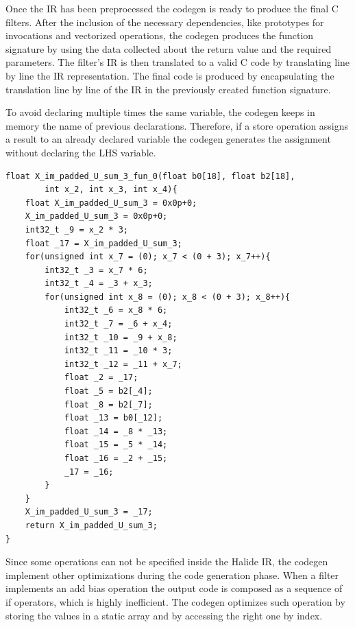 \documentclass[../main.tex]{subfiles}
\begin{document}
Once the IR has been preprocessed the codegen is ready to produce the final C filters.
After the inclusion of the necessary dependencies, like prototypes for invocations and vectorized operations, the codegen produces the function signature by using the data collected about the return value and the required parameters.
The filter's IR is then translated to a valid C code by translating line by line the IR representation.
The final code is produced by encapsulating the translation line by line of the IR in the previously created function signature.

To avoid declaring multiple times the same variable, the codegen keeps in memory the name of previous declarations.
Therefore, if a store operation assigns a result to an already declared variable the codegen generates the assignment without declaring the LHS variable.

\begin{lstlisting}[caption = Output C code of the example filter. The Halide IR has been translated to C code and encapsulated. Since the filter compute only one value a return statement has been added at the end of the function.]
float X_im_padded_U_sum_3_fun_0(float b0[18], float b2[18],
        int x_2, int x_3, int x_4){
    float X_im_padded_U_sum_3 = 0x0p+0;
    X_im_padded_U_sum_3 = 0x0p+0;
    int32_t _9 = x_2 * 3;
    float _17 = X_im_padded_U_sum_3;
    for(unsigned int x_7 = (0); x_7 < (0 + 3); x_7++){
        int32_t _3 = x_7 * 6;
        int32_t _4 = _3 + x_3;
        for(unsigned int x_8 = (0); x_8 < (0 + 3); x_8++){
            int32_t _6 = x_8 * 6;
            int32_t _7 = _6 + x_4;
            int32_t _10 = _9 + x_8;
            int32_t _11 = _10 * 3;
            int32_t _12 = _11 + x_7;
            float _2 = _17;
            float _5 = b2[_4];
            float _8 = b2[_7];
            float _13 = b0[_12];
            float _14 = _8 * _13;
            float _15 = _5 * _14;
            float _16 = _2 + _15;
            _17 = _16;
        }
    }
    X_im_padded_U_sum_3 = _17;
    return X_im_padded_U_sum_3;
}
\end{lstlisting}

Since some operations can not be specified inside the Halide IR, the codegen implement other optimizations during the code generation phase.
When a filter implements an add bias operation the output code is composed as a sequence of if operators, which is highly inefficient.
The codegen optimizes such operation by storing the values in a static array and by accessing the right one by index.
\end{document}
